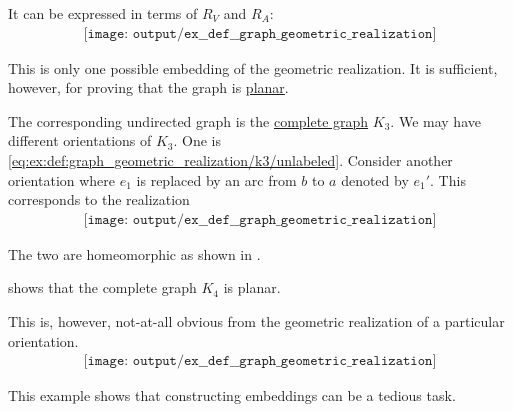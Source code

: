 \begin{example}
\begin{thmenum}
    It can be expressed in terms of \( R_V \) and \( R_A \):
    \begin{equation}\label{eq:ex:def:graph_geometric_realization/k3/unlabeled}
      \begin{aligned}
        \texttt{[image: output/ex\_\_def\_\_graph\_geometric\_realization]}
      \end{aligned}
    \end{equation}

    This is only one possible embedding of the geometric realization. It is sufficient, however, for proving that the graph is \hyperref[def:graph_geometric_realization/planar]{planar}.

    The corresponding undirected graph is the \hyperref[def:complete_graph]{complete graph} \( K_3 \). We may have different orientations of \( K_3 \). One is \eqref{eq:ex:def:graph_geometric_realization/k3/unlabeled}. Consider another orientation where \( e_1 \) is replaced by an arc from \( b \) to \( a \) denoted by \( e_1' \). This corresponds to the realization
    \begin{equation}\label{eq:ex:def:graph_geometric_realization/k3/undirected_2}
      \begin{aligned}
        \texttt{[image: output/ex\_\_def\_\_graph\_geometric\_realization]}
      \end{aligned}
    \end{equation}

    The two are homeomorphic as shown in .

      shows that the complete graph \( K_4 \) is planar.

    This is, however, not-at-all obvious from the geometric realization of a particular orientation.
    \begin{equation}\label{eq:ex:def:graph_geometric_realization/k4/realization}
      \begin{aligned}
        \texttt{[image: output/ex\_\_def\_\_graph\_geometric\_realization]}
      \end{aligned}
    \end{equation}

    This example shows that constructing embeddings can be a tedious task.
  \end{thmenum}
\end{example}

